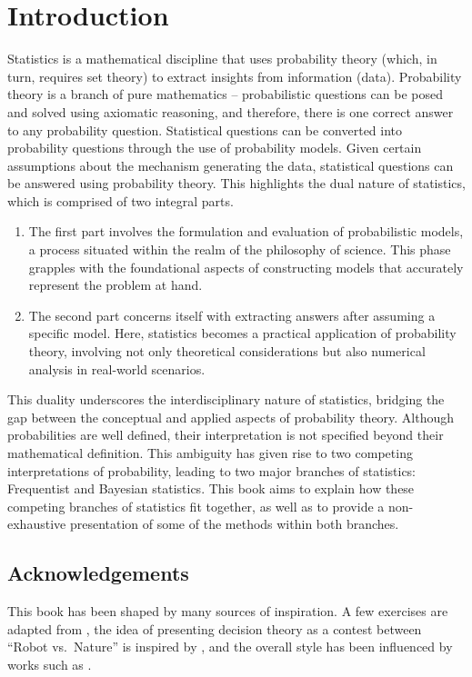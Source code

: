 \chapter{Introduction}
\label{chp:introduction}
Statistics is a mathematical discipline that uses probability theory (which, in turn, requires set theory) to extract insights from information (data). Probability theory is a branch of pure mathematics -- probabilistic questions can be posed and solved using axiomatic reasoning, and therefore, there is one correct answer to any probability question. Statistical questions can be converted into probability questions through the use of probability models. Given certain assumptions about the mechanism generating the data, statistical questions can be answered using probability theory. This highlights the dual nature of statistics, which is comprised of two integral parts. 
\begin{enumerate} 
	\item The first part involves the formulation and evaluation of probabilistic models, a process situated within the realm of the philosophy of science. This phase grapples with the foundational aspects of constructing models that accurately represent the problem at hand. 
	\item The second part concerns itself with extracting answers after assuming a specific model. Here, statistics becomes a practical application of probability theory, involving not only theoretical considerations but also numerical analysis in real-world scenarios. 
\end{enumerate}
This duality underscores the interdisciplinary nature of statistics, bridging the gap between the conceptual and applied aspects of probability theory. Although probabilities are well defined, their interpretation is not specified beyond their mathematical definition. This ambiguity has given rise to two competing interpretations of probability, leading to two major branches of statistics: Frequentist and Bayesian statistics. This book aims to explain how these competing branches of statistics fit together, as well as to provide a non-exhaustive presentation of some of the methods within both branches. 

\section{Acknowledgements}
This book has been shaped by many sources of inspiration. A few exercises are adapted from \cite{murphy2023probabilistic}, the idea of presenting decision theory as a contest between ``Robot vs.\ Nature'' is inspired by \cite{lavalle2006planning}, and the overall style has been influenced by works such as \cite{Sivia2006, murphy2023probabilistic, chan2021introduction}.
